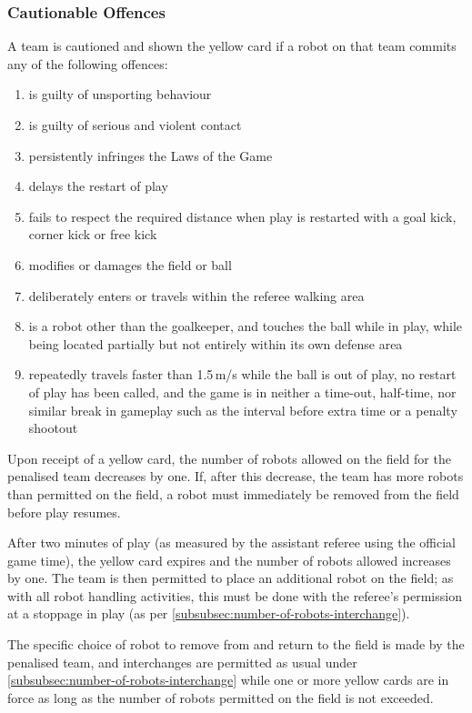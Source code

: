 \subsubsection{Cautionable Offences}
A team is cautioned and shown the yellow card if a robot on that team commits any of the following offences:
\begin{enumerate}
\item is guilty of unsporting behaviour
\item is guilty of serious and violent contact
\item persistently infringes the Laws of the Game
\item delays the restart of play
\item fails to respect the required distance when play is restarted with a goal kick, corner kick or free kick
\item modifies or damages the field or ball
\item deliberately enters or travels within the referee walking area
\item is a robot other than the goalkeeper, and touches the ball while in play, while being located partially but not entirely within its own defense area
\item repeatedly travels faster than 1.5\,m/s while the ball is
out of play, no restart of play has been called, and the game is in neither a
time-out, half-time, nor similar break in gameplay such as the interval before
extra time or a penalty shootout
\end{enumerate}

Upon receipt of a yellow card, the number of robots allowed on the field for the penalised team decreases by one.
If, after this decrease, the team has more robots than permitted on the field, a robot must immediately be removed from the field before play resumes.

After two minutes of play (as measured by the assistant referee using the official game time), the yellow card expires and the number of robots allowed increases by one.
The team is then permitted to place an additional robot on the field; as with all robot handling activities, this must be done with the referee's permission at a stoppage in play (as per \autoref{subsubsec:number-of-robots-interchange}).

The specific choice of robot to remove from and return to the field is made by the penalised team, and interchanges are permitted as usual under \autoref{subsubsec:number-of-robots-interchange} while one or more yellow cards are in force as long as the number of robots permitted on the field is not exceeded.

